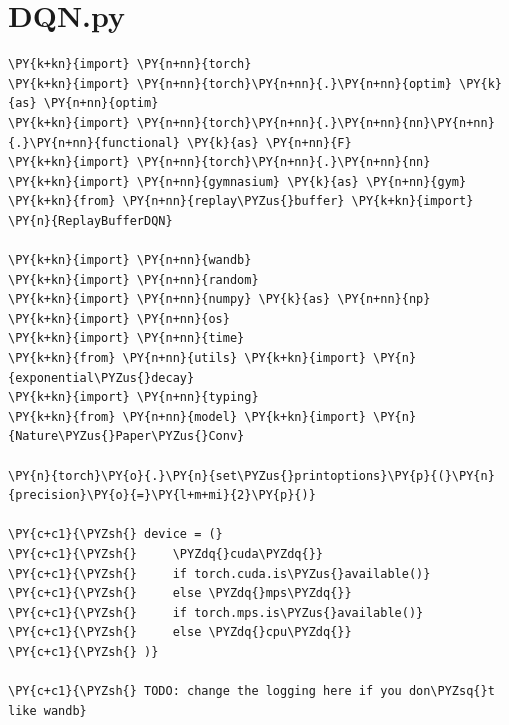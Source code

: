 \documentclass{article}
\begin{document}
\section*{DQN.py}
\begin{Verbatim}[commandchars=\\\{\}]
\PY{k+kn}{import} \PY{n+nn}{torch}
\PY{k+kn}{import} \PY{n+nn}{torch}\PY{n+nn}{.}\PY{n+nn}{optim} \PY{k}{as} \PY{n+nn}{optim}
\PY{k+kn}{import} \PY{n+nn}{torch}\PY{n+nn}{.}\PY{n+nn}{nn}\PY{n+nn}{.}\PY{n+nn}{functional} \PY{k}{as} \PY{n+nn}{F}
\PY{k+kn}{import} \PY{n+nn}{torch}\PY{n+nn}{.}\PY{n+nn}{nn}
\PY{k+kn}{import} \PY{n+nn}{gymnasium} \PY{k}{as} \PY{n+nn}{gym}
\PY{k+kn}{from} \PY{n+nn}{replay\PYZus{}buffer} \PY{k+kn}{import} \PY{n}{ReplayBufferDQN}

\PY{k+kn}{import} \PY{n+nn}{wandb}
\PY{k+kn}{import} \PY{n+nn}{random}
\PY{k+kn}{import} \PY{n+nn}{numpy} \PY{k}{as} \PY{n+nn}{np}
\PY{k+kn}{import} \PY{n+nn}{os}
\PY{k+kn}{import} \PY{n+nn}{time}
\PY{k+kn}{from} \PY{n+nn}{utils} \PY{k+kn}{import} \PY{n}{exponential\PYZus{}decay}
\PY{k+kn}{import} \PY{n+nn}{typing}
\PY{k+kn}{from} \PY{n+nn}{model} \PY{k+kn}{import} \PY{n}{Nature\PYZus{}Paper\PYZus{}Conv}

\PY{n}{torch}\PY{o}{.}\PY{n}{set\PYZus{}printoptions}\PY{p}{(}\PY{n}{precision}\PY{o}{=}\PY{l+m+mi}{2}\PY{p}{)}

\PY{c+c1}{\PYZsh{} device = (}
\PY{c+c1}{\PYZsh{}     \PYZdq{}cuda\PYZdq{}}
\PY{c+c1}{\PYZsh{}     if torch.cuda.is\PYZus{}available()}
\PY{c+c1}{\PYZsh{}     else \PYZdq{}mps\PYZdq{}}
\PY{c+c1}{\PYZsh{}     if torch.mps.is\PYZus{}available()}
\PY{c+c1}{\PYZsh{}     else \PYZdq{}cpu\PYZdq{}}
\PY{c+c1}{\PYZsh{} )}

\PY{c+c1}{\PYZsh{} TODO: change the logging here if you don\PYZsq{}t like wandb}



\end{Verbatim}
\end{document}
